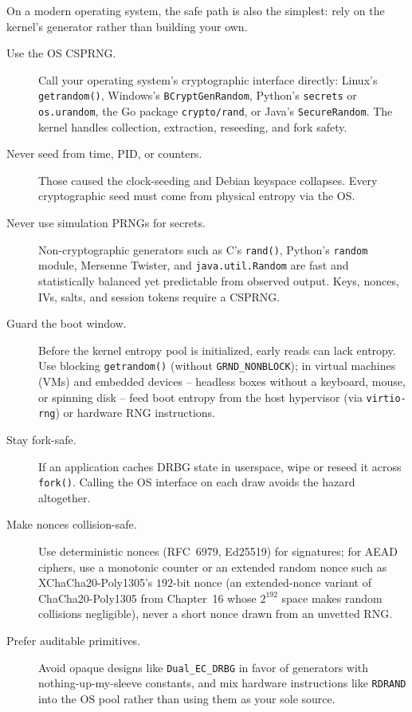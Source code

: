 On a modern operating system, the safe path is also the simplest: rely on the kernel's generator rather than building your own.

\begin{description}
  \item[Use the OS CSPRNG.] Call your operating system's cryptographic interface directly: Linux's \texttt{getrandom()}, Windows's \texttt{BCryptGenRandom}, Python's \texttt{secrets} or \texttt{os.urandom}, the Go package \texttt{crypto/rand}, or Java's \texttt{SecureRandom}. The kernel handles collection, extraction, reseeding, and fork safety.
  \item[Never seed from time, PID, or counters.] Those caused the clock-seeding and Debian keyspace collapses. Every cryptographic seed must come from physical entropy via the OS.
  \item[Never use simulation PRNGs for secrets.] Non-cryptographic generators such as C's \texttt{rand()}, Python's \texttt{random} module, Mersenne Twister, and \texttt{java.util.Random} are fast and statistically balanced yet predictable from observed output. Keys, nonces, IVs, salts, and session tokens require a CSPRNG.
  \item[Guard the boot window.] Before the kernel entropy pool is initialized, early reads can lack entropy. Use blocking \texttt{getrandom()} (without \texttt{GRND\_NONBLOCK}); in virtual machines (VMs) and embedded devices -- headless boxes without a keyboard, mouse, or spinning disk -- feed boot entropy from the host hypervisor (via \texttt{virtio-rng}) or hardware RNG instructions.
  \item[Stay fork-safe.] If an application caches DRBG state in userspace, wipe or reseed it across \texttt{fork()}. Calling the OS interface on each draw avoids the hazard altogether.
  \item[Make nonces collision-safe.] Use deterministic nonces (RFC~6979, Ed25519) for signatures; for AEAD ciphers, use a monotonic counter or an extended random nonce such as XChaCha20-Poly1305's $192$-bit nonce (an extended-nonce variant of ChaCha20-Poly1305 from Chapter~16 whose $2^{192}$ space makes random collisions negligible), never a short nonce drawn from an unvetted RNG.
  \item[Prefer auditable primitives.] Avoid opaque designs like \texttt{Dual\_EC\_DRBG} in favor of generators with nothing-up-my-sleeve constants, and mix hardware instructions like \texttt{RDRAND} into the OS pool rather than using them as your sole source.
\end{description}

